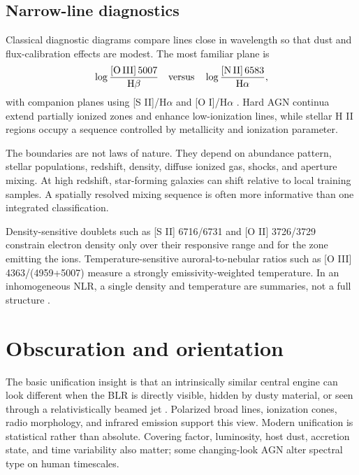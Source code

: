 \subsection{Narrow-line diagnostics}

Classical diagnostic diagrams compare lines close in wavelength so that dust
and flux-calibration effects are modest. The most familiar plane is
\begin{equation}
 \log\frac{[\mathrm{O\,III}]\,5007}{\mathrm{H}\beta}
 \quad {\rm versus}\quad
 \log\frac{[\mathrm{N\,II}]\,6583}{\mathrm{H}\alpha},
 \label{eq:bpt}
\end{equation}
with companion planes using [S II]/H$\alpha$ and [O I]/H$\alpha$
\citep{Baldwin1981,Kewley2001,Kauffmann2003,Kewley2006}. Hard AGN continua
extend partially ionized zones and enhance low-ionization lines, while stellar
H II regions occupy a sequence controlled by metallicity and ionization
parameter.

The boundaries are not laws of nature. They depend on abundance pattern,
stellar populations, redshift, density, diffuse ionized gas, shocks, and
aperture mixing. At high redshift, star-forming galaxies can shift relative
to local training samples. A spatially resolved mixing sequence is often more
informative than one integrated classification.

Density-sensitive doublets such as [S II] 6716/6731 and [O II] 3726/3729
constrain electron density only over their responsive range and for the zone
emitting the ions. Temperature-sensitive auroral-to-nebular ratios such as
[O III] 4363/(4959+5007) measure a strongly emissivity-weighted temperature.
In an inhomogeneous NLR, a single density and temperature are summaries, not
a full structure \citep{OsterbrockFerland2006}.

\section{Obscuration and orientation}

The basic unification insight is that an intrinsically similar central engine
can look different when the BLR is directly visible, hidden by dusty material,
or seen through a relativistically beamed jet \citep{UrryPadovani1995}.
Polarized broad lines, ionization cones, radio morphology, and infrared
emission support this view. Modern unification is statistical rather than
absolute. Covering factor, luminosity, host dust, accretion state, and time
variability also matter; some changing-look AGN alter spectral type on human
timescales.

